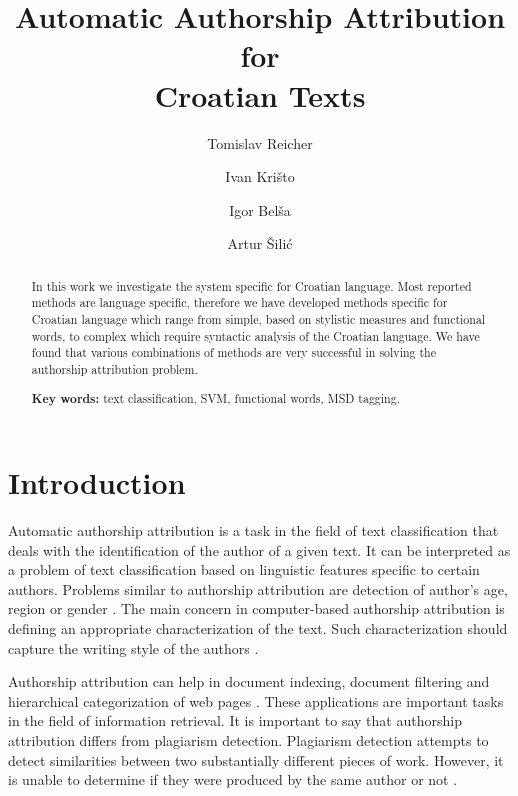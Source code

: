 \documentclass{llncs}
\begin{document}
\title{Automatic Authorship Attribution for\\Croatian Texts}
\author{Tomislav Reicher \and Ivan Krišto \and Igor Belša \and Artur Šilić}

\maketitle

\begin{abstract}
In this work we investigate the system specific for Croatian language. Most
reported methods are language specific, therefore we have developed methods
specific for Croatian language which range from simple, based on stylistic
measures and functional words, to complex which require syntactic analysis of the
Croatian language. We have found that various combinations of methods are very
successful in solving the authorship attribution problem.

\vspace{10pt}
\textbf{Key words:} text classification, SVM, functional words, MSD tagging.
\end{abstract}

\section{Introduction}
Automatic authorship attribution is a task in the field of text classification
that deals with the identification of the author of a given text. It can
be interpreted as a problem of text classification based on linguistic features
specific to certain authors. Problems similar to authorship attribution are
detection of author's age, region or gender \cite{luyckx2005shallow}. The main
concern in computer-based authorship attribution is defining an appropriate
characterization of the text. Such characterization should capture the writing
style of the authors \cite{coyotl2006authorship}.

Authorship attribution can help in document indexing, document filtering and
hierarchical categorization of web pages \cite{luyckx2005shallow}. These
applications are important tasks in the field of information retrieval. 
It is important to say that authorship attribution differs from plagiarism
detection. Plagiarism detection attempts to detect similarities between two substantially different pieces of
work. However, it is unable to determine if they were produced by the same author or not
\cite{de2001mining}.
\end{document}
